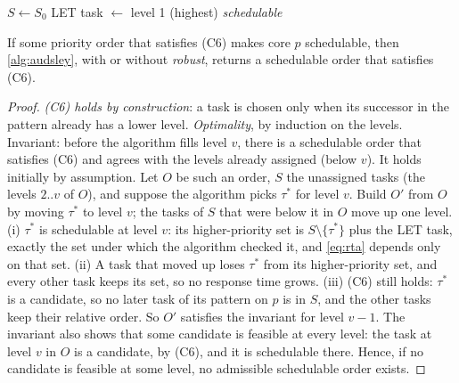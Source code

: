 \begin{algorithm2e}[t]
\caption{\textsf{Priorities}$(p,\textit{robust})$: optimal priority
assignment that respects precedence}
\label{alg:audsley}
$S\gets S_0$\;
LET task $\gets$ level 1 (highest)\;
\Return \emph{schedulable}\;
\end{algorithm2e}

\begin{theorem}[Optimality]
\label{thm:audsley}
If some priority order that satisfies (C6) makes core $p$ schedulable,
then \cref{alg:audsley}, with or without \textit{robust}, returns a
schedulable order that satisfies (C6).
\end{theorem}
\begin{proof}
\emph{(C6) holds by construction}: a task is chosen only when its
successor in the pattern already has a lower level.
\emph{Optimality}, by induction on the levels. Invariant: before the
algorithm fills level $v$, there is a schedulable order that satisfies
(C6) and agrees with the levels already assigned (below $v$). It holds
initially by assumption. Let $O$ be such an order, $S$ the unassigned
tasks (the levels $2..v$ of $O$), and suppose the algorithm picks
$\tau^\ast$ for level $v$. Build $O'$ from $O$ by moving $\tau^\ast$ to
level $v$; the tasks of $S$ that were below it in $O$ move up one level.
(i) $\tau^\ast$ is schedulable at level $v$: its higher-priority set is
$S\setminus\{\tau^\ast\}$ plus the LET task, exactly the set under which the
algorithm checked it, and \cref{eq:rta} depends only on that set. (ii) A
task that moved up loses $\tau^\ast$ from its higher-priority set, and every
other task keeps its set, so no response time grows. (iii) (C6) still holds:
$\tau^\ast$ is a candidate, so no later task of its pattern on $p$ is in
$S$, and the other tasks keep their relative order. So $O'$ satisfies the
invariant for level $v-1$. The invariant also shows that some candidate
is feasible at every level: the task at level $v$ in $O$ is a candidate,
by (C6), and it is schedulable there. Hence, if no candidate is feasible at
some level, no admissible schedulable order exists.
\end{proof}

